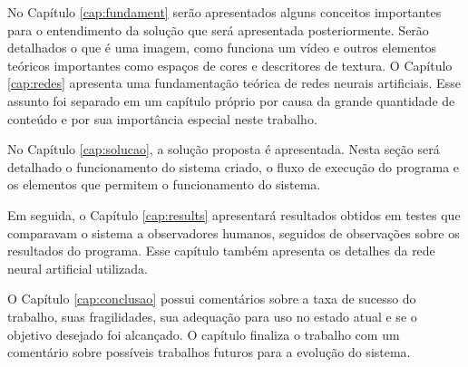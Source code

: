 			No Capítulo \ref{cap:fundament} serão apresentados alguns conceitos importantes para o entendimento da solução que será apresentada posteriormente. Serão detalhados o que é uma imagem, como funciona um vídeo e outros elementos teóricos importantes como espaços de cores e descritores de textura. O Capítulo \ref{cap:redes} apresenta uma fundamentação teórica de redes neurais artificiais. Esse assunto foi separado em um capítulo próprio por causa da grande quantidade de conteúdo e por sua importância especial neste trabalho.
			
			No Capítulo \ref{cap:solucao}, a solução proposta é apresentada. Nesta seção será detalhado o funcionamento do sistema criado, o fluxo de execução do programa e os elementos que permitem o funcionamento do sistema.
			
			Em seguida, o Capítulo \ref{cap:results} apresentará resultados obtidos em testes que comparavam o sistema a observadores humanos, seguidos de observações sobre os resultados do programa. Esse capítulo também apresenta os detalhes da rede neural artificial utilizada.
			
			O Capítulo \ref{cap:conclusao} possui comentários sobre a taxa de sucesso do trabalho, suas fragilidades, sua adequação para uso no estado atual e se o objetivo desejado foi alcançado. O capítulo finaliza o trabalho com um comentário sobre possíveis trabalhos futuros para a evolução do sistema.
			
			








